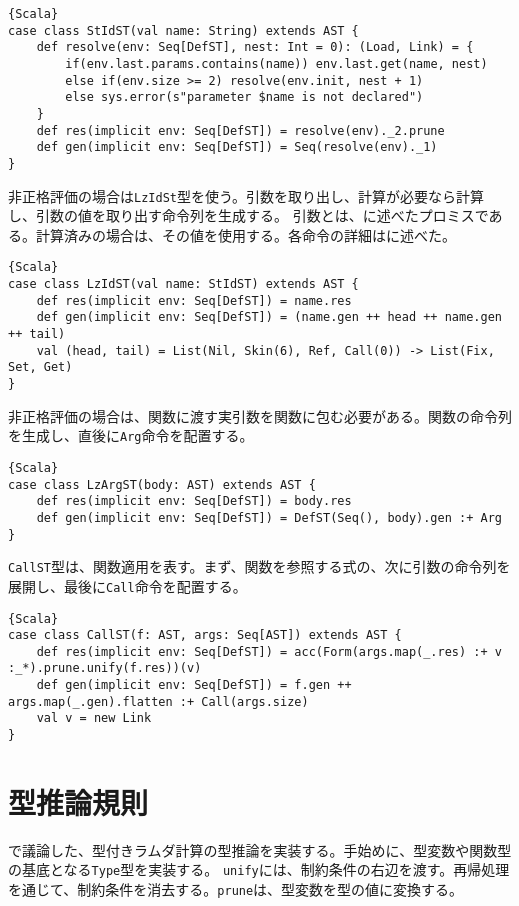 \documentclass[10pt,a4paper]{book}
\begin{document}
\begin{Verbatim}{Scala}
case class StIdST(val name: String) extends AST {
	def resolve(env: Seq[DefST], nest: Int = 0): (Load, Link) = {
		if(env.last.params.contains(name)) env.last.get(name, nest)
		else if(env.size >= 2) resolve(env.init, nest + 1)
		else sys.error(s"parameter $name is not declared")
	}
	def res(implicit env: Seq[DefST]) = resolve(env)._2.prune
	def gen(implicit env: Seq[DefST]) = Seq(resolve(env)._1)
}
\end{Verbatim}

非正格評価の場合は\texttt{LzIdSt}型を使う。引数を取り出し、計算が必要なら計算し、引数の値を取り出す命令列を生成する。
引数とは、に述べたプロミスである。計算済みの場合は、その値を使用する。各命令の詳細はに述べた。

\begin{Verbatim}{Scala}
case class LzIdST(val name: StIdST) extends AST {
	def res(implicit env: Seq[DefST]) = name.res
	def gen(implicit env: Seq[DefST]) = (name.gen ++ head ++ name.gen ++ tail)
	val (head, tail) = List(Nil, Skin(6), Ref, Call(0)) -> List(Fix, Set, Get)
}
\end{Verbatim}

非正格評価の場合は、関数に渡す実引数を関数に包む必要がある。関数の命令列を生成し、直後に\texttt{Arg}命令を配置する。

\begin{Verbatim}{Scala}
case class LzArgST(body: AST) extends AST {
	def res(implicit env: Seq[DefST]) = body.res
	def gen(implicit env: Seq[DefST]) = DefST(Seq(), body).gen :+ Arg
}
\end{Verbatim}

\texttt{CallST}型は、関数適用を表す。まず、関数を参照する式の、次に引数の命令列を展開し、最後に\texttt{Call}命令を配置する。

\begin{Verbatim}{Scala}
case class CallST(f: AST, args: Seq[AST]) extends AST {
	def res(implicit env: Seq[DefST]) = acc(Form(args.map(_.res) :+ v :_*).prune.unify(f.res))(v)
	def gen(implicit env: Seq[DefST]) = f.gen ++ args.map(_.gen).flatten :+ Call(args.size)
	val v = new Link
}
\end{Verbatim}

\section{型推論規則\label{sect:type}}

で議論した、型付きラムダ計算の型推論を実装する。手始めに、型変数や関数型の基底となる\texttt{Type}型を実装する。
\texttt{unify}には、制約条件の右辺を渡す。再帰処理を通じて、制約条件を消去する。\texttt{prune}は、型変数を型の値に変換する。
\end{document}
